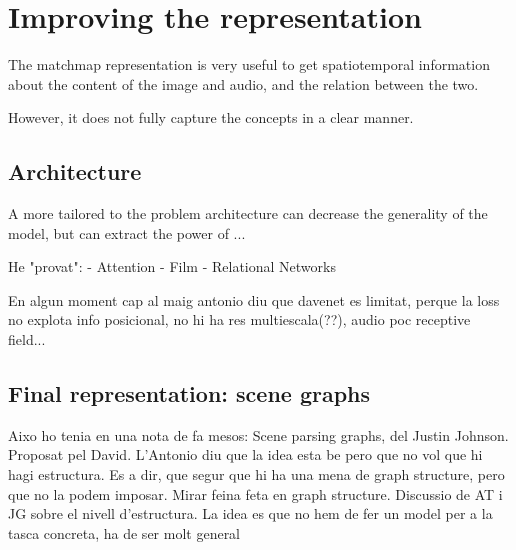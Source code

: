 \chapter{Improving the representation}

The matchmap representation is very useful to get spatiotemporal information about the content of the image and audio, and the relation between the two.

However, it does not fully capture the concepts in a clear manner. 

\section{Architecture}

A more tailored to the problem architecture can decrease the generality of the model, but can extract the power of ...

He "provat":
- Attention
- Film \cite{film}
- Relational Networks \cite{NIPS2017_7082}

En algun moment cap al maig antonio diu que davenet es limitat, perque la loss no explota info posicional, no hi ha res multiescala(??), audio poc receptive field...



\section{Final representation: scene graphs}

Aixo ho tenia en una nota de fa mesos:
Scene parsing graphs, del Justin Johnson. Proposat pel David. L’Antonio diu que la idea esta be pero que no vol que hi hagi estructura. Es a dir, que segur que hi ha una mena de graph structure, pero que no la podem imposar. Mirar feina feta en graph structure. Discussio de AT i JG sobre el nivell d’estructura. La idea es que no hem de fer un model per a la tasca concreta, ha de ser molt general